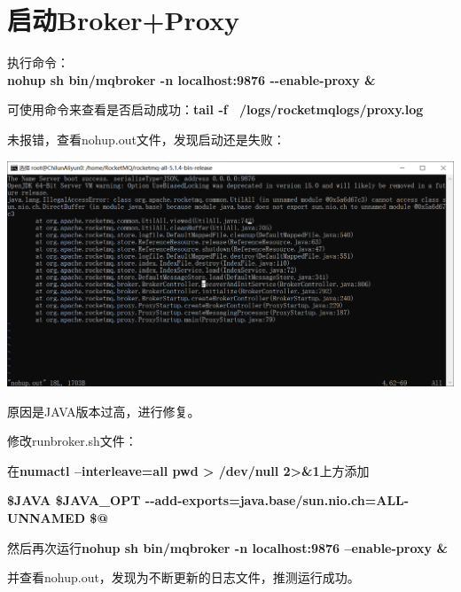 \documentclass[11pt, a4paper, oneside, fontset=none]{ctexbook}
\begin{document}
\section{启动Broker+Proxy}
执行命令：\\{\bfseries\kaishu nohup sh bin/mqbroker -n localhost:9876 -{}-enable-proxy \&}

可使用命令来查看是否启动成功：{\bfseries\kaishu tail -f ~/logs/rocketmqlogs/proxy.log}

未报错，查看nohup.out文件，发现启动还是失败：
\begin{center}
  \begin{minipage}{\textwidth}
    \center
    \includegraphics[width=\textwidth]{picture/broker启动失败.png}
    \captionsetup{hypcap=false}
    \label{fig:broker启动失败}
  \end{minipage}
\end{center}

原因是JAVA版本过高，进行修复。

修改runbroker.sh文件：

在{\bfseries\kaishu numactl --interleave=all pwd > /dev/null 2>\&1}上方添加

{\bfseries\kaishu \$JAVA \${JAVA\_OPT} {-}{-}add-exports=java.base/sun.nio.ch=ALL-UNNAMED \$@}


然后再次运行{\bfseries\kaishu nohup sh bin/mqbroker -n localhost:9876 –enable-proxy \&}

并查看nohup.out，发现为不断更新的日志文件，推测运行成功。
\end{document}
